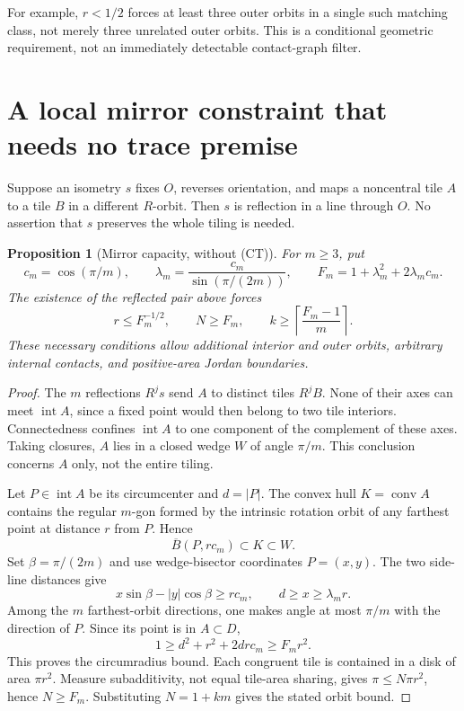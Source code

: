\documentclass[11pt]{article}
\newtheorem{proposition}{Proposition}
\newcommand{\Int}{\operatorname{int}}
\newcommand{\conv}{\operatorname{conv}}
\begin{document}
For example, $r<1/2$ forces at least three outer orbits in a single such
matching class, not merely three unrelated outer orbits. This is a conditional
geometric requirement, not an immediately detectable contact-graph filter.

\section{A local mirror constraint that needs no trace premise}

Suppose an isometry $s$ fixes $O$, reverses orientation, and maps a noncentral
tile $A$ to a tile $B$ in a different $R$-orbit. Then $s$ is reflection in a
line through $O$. No assertion that $s$ preserves the whole tiling is needed.

\begin{proposition}[Mirror capacity, without (CT)]\label{prop:mirror}
For $m\geq3$, put
\[
 c_m=\cos(\pi/m),\qquad
 \lambda_m=\frac{c_m}{\sin(\pi/(2m))},\qquad
 F_m=1+\lambda_m^2+2\lambda_m c_m.
\]
The existence of the reflected pair above forces
\[
 r\leq F_m^{-1/2},\qquad N\geq F_m,
 \qquad k\geq\left\lceil\frac{F_m-1}{m}\right\rceil.
\]
These necessary conditions allow additional interior and outer orbits, arbitrary
internal contacts, and positive-area Jordan boundaries.
\end{proposition}

\begin{proof}
The $m$ reflections $R^js$ send $A$ to distinct tiles $R^jB$. None of their
axes can meet $\Int A$, since a fixed point would then belong to two tile
interiors. Connectedness confines $\Int A$ to one component of the complement
of these axes. Taking closures, $A$ lies in a closed wedge $W$ of angle
$\pi/m$. This conclusion concerns $A$ only, not the entire tiling.

Let $P\in\Int A$ be its circumcenter and $d=|P|$. The convex hull
$K=\conv A$ contains the regular $m$-gon formed by the intrinsic rotation
orbit of any farthest point at distance $r$ from $P$. Hence
\[
 \overline B(P,r c_m)\subset K\subset W.
\]
Set $\beta=\pi/(2m)$ and use wedge-bisector coordinates $P=(x,y)$.
The two side-line distances give
\[
 x\sin\beta-|y|\cos\beta\geq r c_m,
 \qquad d\geq x\geq\lambda_m r.
\]
Among the $m$ farthest-orbit directions, one makes angle at most $\pi/m$
with the direction of $P$. Since its point is in $A\subset D$,
\[
 1\geq d^2+r^2+2dr c_m\geq F_m r^2.
\]
This proves the circumradius bound. Each congruent tile is contained in a
disk of area $\pi r^2$. Measure subadditivity, not equal tile-area sharing,
gives $\pi\leq N\pi r^2$, hence $N\geq F_m$. Substituting $N=1+km$
gives the stated orbit bound.
\end{proof}
\end{document}
